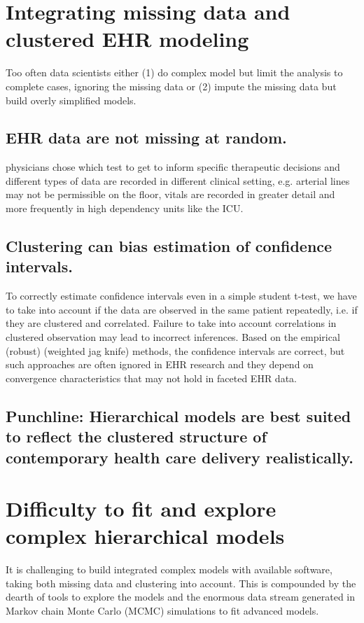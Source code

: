 \documentclass[11pt,notitlepage]{article}
\begin{document}
\section*{Integrating missing data and clustered EHR modeling}

Too often data scientists either (1) do complex model but limit the analysis to complete cases, ignoring the missing data or (2) impute the missing data but build overly simplified models. 

\subsection*{EHR data are not missing at random.} physicians chose which test to get to inform specific therapeutic decisions and different types of data are recorded in different clinical setting, e.g. arterial lines may not be permissible on the floor, vitals are recorded in greater detail and more frequently in high dependency units like the ICU. 

\subsection*{Clustering can bias estimation of confidence intervals.} To correctly estimate confidence intervals even in a simple student t-test, we have to take into account if the data are observed in the same patient repeatedly, i.e. if they are clustered and correlated. Failure to take into account correlations in clustered observation may lead to incorrect inferences. Based on the empirical (robust) (weighted jag knife) methods, the confidence intervals are correct, but such approaches are often ignored in EHR research and they depend on convergence characteristics that may not hold in faceted EHR data. 

\subsection*{Punchline: Hierarchical models  are best suited to reflect the clustered structure of contemporary health care delivery realistically.}

\section*{Difficulty to fit and explore complex hierarchical models}
It is challenging to build integrated complex models with available software, taking both missing data and clustering  into account. This is compounded by the dearth of tools to explore the models and the enormous data stream generated in Markov chain Monte Carlo (MCMC) simulations to fit advanced models.   
\end{document}
